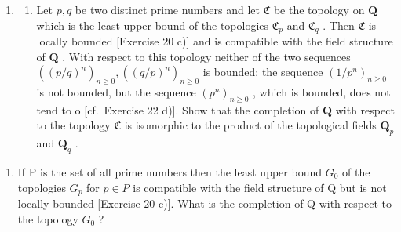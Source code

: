 \begin{enumerate}
\def\labelenumi{\arabic{enumi})}
\setcounter{enumi}{25}
\tightlist
\item
  \begin{enumerate}
  \def\labelenumii{\alph{enumii})}
  \tightlist
  \item
    Let \(p, q\) be two distinct prime numbers and let \(\mathfrak{C}\) be the topology on \(\mathbf{Q}\) which is the least upper bound of the topologies \(\mathfrak{C}_p\) and \(\mathfrak{C}_q\) . Then \(\mathfrak{C}\) is locally bounded {[}Exercise 20 c){]} and is compatible with the field structure of \(\mathbf{Q}\) . With respect to this topology neither of the two sequences \(((p/q)^n)_{n\geqslant 0}, ((q/p)^n)_{n\geqslant 0}\) is bounded; the sequence \((1/p^n)_{n\geqslant 0}\) is not bounded, but the sequence \((p^n)_{n\geqslant 0}\) , which is bounded, does not tend to o {[}cf.~Exercise 22 d){]}. Show that the completion of \(\mathbf{Q}\) with respect to the topology \(\mathfrak{C}\) is isomorphic to the product of the topological fields \(\mathbf{Q}_p\) and \(\mathbf{Q}_q\) .
  \end{enumerate}
\end{enumerate}

\begin{enumerate}
\def\labelenumi{\alph{enumi})}
\setcounter{enumi}{1}
\tightlist
\item
  If P is the set of all prime numbers then the least upper bound \(G_{0}\) of the topologies \(G_{p}\) for \(p \in P\) is compatible with the field structure of Q but is not locally bounded {[}Exercise 20 c){]}. What is the completion of Q with respect to the topology \(G_{0}\) ?
\end{enumerate}

